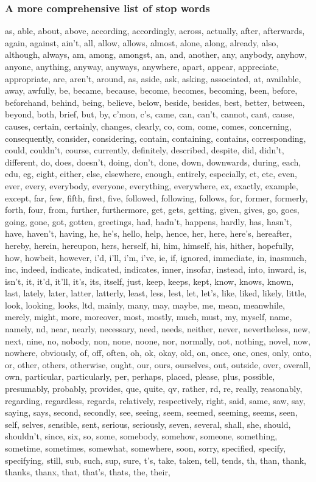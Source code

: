 \documentclass[notes=hide]{beamer}
\begin{document}
\begin{frame}
	\frametitle{A more comprehensive list of stop words}
	\begin{spacing}{.8}
		\tiny
		as, able, about, above, according, accordingly, across, actually, after, afterwards, again, against, ain't, all, allow, allows, almost, alone, along, already, also, although, always, am, among, amongst, an, and, another, any, anybody, anyhow, anyone, anything, anyway, anyways, anywhere, apart, appear, appreciate, appropriate, are, aren't, around, as, aside, ask, asking, associated, at, available, away, awfully, be, became, because, become, becomes, becoming, been, before, beforehand, behind, being, believe, below, beside, besides, best, better, between, beyond, both, brief, but, by, c'mon, c's, came, can, can't, cannot, cant, cause, causes, certain, certainly, changes, clearly, co, com, come, comes, concerning, consequently, consider, considering, contain, containing, contains, corresponding, could, couldn't, course, currently, definitely, described, despite, did, didn't, different, do, does, doesn't, doing, don't, done, down, downwards, during, each, edu, eg, eight, either, else, elsewhere, enough, entirely, especially, et, etc, even, ever, every, everybody, everyone, everything, everywhere, ex, exactly, example, except, far, few, fifth, first, five, followed, following, follows, for, former, formerly, forth, four, from, further, furthermore, get, gets, getting, given, gives, go, goes, going, gone, got, gotten, greetings, had, hadn't, happens, hardly, has, hasn't, have, haven't, having, he, he's, hello, help, hence, her, here, here's, hereafter, hereby, herein, hereupon, hers, herself, hi, him, himself, his, hither, hopefully, how, howbeit, however, i'd, i'll, i'm, i've, ie, if, ignored, immediate, in, inasmuch, inc, indeed, indicate, indicated, indicates, inner, insofar, instead, into, inward, is, isn't, it, it'd, it'll, it's, its, itself, just, keep, keeps, kept, know, knows, known, last, lately, later, latter, latterly, least, less, lest, let, let's, like, liked, likely, little, look, looking, looks, ltd, mainly, many, may, maybe, me, mean, meanwhile, merely, might, more, moreover, most, mostly, much, must, my, myself, name, namely, nd, near, nearly, necessary, need, needs, neither, never, nevertheless, new, next, nine, no, nobody, non, none, noone, nor, normally, not, nothing, novel, now, nowhere, obviously, of, off, often, oh, ok, okay, old, on, once, one, ones, only, onto, or, other, others, otherwise, ought, our, ours, ourselves, out, outside, over, overall, own, particular, particularly, per, perhaps, placed, please, plus, possible, presumably, probably, provides, que, quite, qv, rather, rd, re, really, reasonably, regarding, regardless, regards, relatively, respectively, right, said, same, saw, say, saying, says, second, secondly, see, seeing, seem, seemed, seeming, seems, seen, self, selves, sensible, sent, serious, seriously, seven, several, shall, she, should, shouldn't, since, six, so, some, somebody, somehow, someone, something, sometime, sometimes, somewhat, somewhere, soon, sorry, specified, specify, specifying, still, sub, such, sup, sure, t's, take, taken, tell, tends, th, than, thank, thanks, thanx, that, that's, thats, the, their, 
\end{spacing}
\end{frame}
\end{document}
